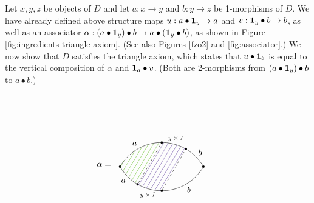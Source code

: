 Let $x,y,z$ be objects of $D$ and let $a:x\to y$ and $b:y\to z$ be 1-morphisms of $D$.
We have already defined above 
structure maps $u:a\bullet \boldsymbol{1}_y\to a$ and $v:\boldsymbol{1}_y\bullet b\to b$, as well as an associator
$\alpha: (a\bullet \boldsymbol{1}_y)\bullet b\to a\bullet(\boldsymbol{1}_y\bullet b)$, as shown in
Figure \ref{fig:ingredients-triangle-axiom}.
(See also Figures \ref{fzo2} and \ref{fig:associator}.)
We now show that $D$ satisfies the triangle axiom, which states that $u\bullet\boldsymbol{1}_b$ 
is equal to the vertical composition of $\alpha$ and $\boldsymbol{1}_a\bullet v$.
(Both are 2-morphisms from $(a\bullet \boldsymbol{1}_y)\bullet b$ to $a\bullet b$.)
\begin{figure}[t]
\begin{align*}
\alpha & = 
\begin{tikzpicture}[baseline]
\node[circle,fill=black,inner sep=1pt] at (1.73,0) {};
\node[circle,fill=black,inner sep=1pt] at (-1.73,0) {};
\begin{scope}[yshift=-1cm]
\path[clip] (0,0) circle (2);
\begin{scope}[yshift=2cm]
\draw (0,0) circle (2);
\node[circle,fill=black,inner sep=1pt] (L2) at (-90:2) {};
\node[circle,fill=black,inner sep=1pt] (L1) at (-120:2) {};
\node at (-60:2.25) {$b$};
\node at (-105:2.25) {\scriptsize $y \times I$};
\node at (-135:2.25) {$a$};
\end{scope}
\end{scope}
\begin{scope}[yshift=1cm]
\path[clip] (0,0) circle (2);
\begin{scope}[yshift=-2cm]
\node at (120:2.25) {$a$};
\node at (75:2.25) {\scriptsize $y \times I$};
\node at (45:2.25) {$b$};
\draw (0,0) circle (2);
\node[circle,fill=black,inner sep=1pt] (U1) at (90:2) {};
\node[circle,fill=black,inner sep=1pt] (U2) at (60:2) {};
\end{scope}
\end{scope}
\draw[dashed] (L1) -- (U1);
\draw[dashed] (L2) -- (U2);
\begin{scope}
\path[clip] (0,1) circle (2);
\path[clip] (0,-1) circle (2);
		\foreach \t in {-2.5,-2.3,...,-1.2} {
			\draw[green!50!brown] (\t,-1) -- +(1.19,2);
		}
		\foreach \t in {-1.1,-0.9,...,0} {
			\draw[blue!50!brown] (\t,-1) -- +(1.19,2);
		}
		\foreach \t in {0.1,0.3,...,2.5} {
}
\end{scope}
\end{tikzpicture}
\end{align*}
\end{figure}
